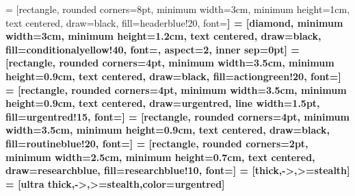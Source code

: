 %
%
 = [rectangle, rounded corners=8pt, minimum width=3cm,
  minimum height=1cm, text centered, draw=black, fill=headerblue!20,
  font=\small\bfseries]
 = [diamond, minimum width=3cm, minimum height=1.2cm,
  text centered, draw=black, fill=conditionalyellow!40, font=\small,
  aspect=2, inner sep=0pt]
 = [rectangle, rounded corners=4pt, minimum width=3.5cm,
  minimum height=0.9cm, text centered, draw=black, fill=actiongreen!20,
  font=\small]
 = [rectangle, rounded corners=4pt, minimum width=3.5cm,
  minimum height=0.9cm, text centered, draw=urgentred, line width=1.5pt,
  fill=urgentred!15, font=\small\bfseries]
 = [rectangle, rounded corners=4pt, minimum width=3.5cm,
  minimum height=0.9cm, text centered, draw=black, fill=routineblue!20,
  font=\small]
 = [rectangle, rounded corners=2pt, minimum width=2.5cm,
  minimum height=0.7cm, text centered, draw=researchblue, fill=researchblue!10,
  font=\footnotesize]
 = [thick,->,>=stealth]
 = [ultra thick,->,>=stealth,color=urgentred]
%
%
%
%



